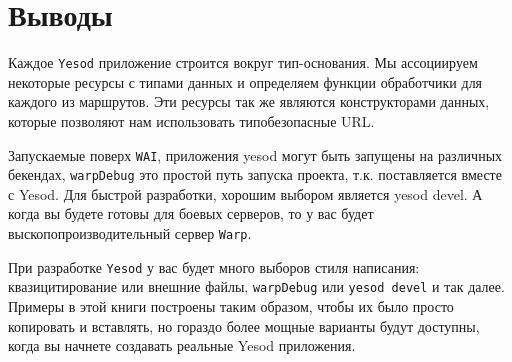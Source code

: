\section{Выводы}

Каждое \texttt{Yesod} приложение строится вокруг тип-основания. 
Мы ассоциируем некоторые ресурсы с типами данных и определяем функции обработчики 
для каждого из маршрутов. Эти ресурсы так же являются конструкторами данных, 
которые позволяют нам использовать типобезопасные URL.

Запускаемые поверх \texttt{WAI}, приложения yesod могут быть запущены на различных 
бекендах, \lstinline!warpDebug! это простой путь запуска проекта, т.к.
поставляется вместе с Yesod. Для быстрой разработки, хорошим выбором является yesod devel. 
А когда вы будете готовы для боевых серверов, то у вас будет выскопопроизводительный
сервер \texttt{Warp}.

При разработке \texttt{Yesod} у вас будет много выборов стиля написания: 
квазицитирование или внешние файлы,
\lstinline{warpDebug} или \lstinline'yesod devel' и так далее. Примеры в этой книги построены 
таким образом, чтобы их было просто копировать и вставлять, но гораздо более мощные варианты 
будут доступны, когда вы начнете создавать реальные Yesod приложения.
